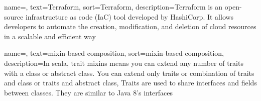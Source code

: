
\renewcommand{\acronymname}{Acronimi e abbreviazioni}




%


{
    name=,
    text=Terraform,
    sort=Terraform,
    description={Terraform is an open-source infrastructure as code (IaC) tool developed by HashiCorp. It allows developers to automate the creation, modification, and deletion of cloud resources in a scalable and efficient way }
}

{
    name=,
    text=mixin-based composition,
    sort=mixin-based composition,
    description={In scala, trait mixins means you can extend any number of traits with a class or abstract class. You can extend only traits or combination of traits and class or traits and abstract class,
    Traits are used to share interfaces and fields between classes. They are similar to Java 8’s interfaces }
}
